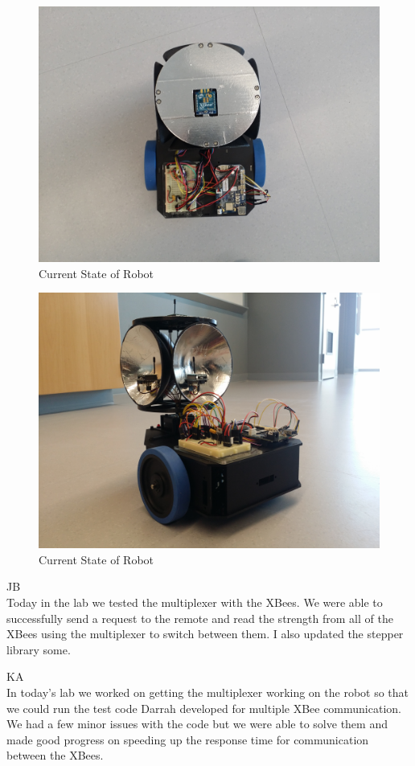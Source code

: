 \documentclass[fontsize=11pt, %
                             paper=letter, %
                             openany, %
                             captions=tableheading,
                             index=totoc,
                             hyperref]{labbook}
\begin{document}
\begin{addmargin}[0cm]{0cm}
\begin{figure}
    \center
    \includegraphics[width=4.5in]{figs/img/robot2.jpg}
    \caption{Current State of Robot}
    \label{fig:robot2}
\end{figure}

\begin{figure}
    \center
    \includegraphics[width=4.5in]{figs/img/robot3.jpg}
    \caption{Current State of Robot}
    \label{fig:robot3}
\end{figure}

JB\\
Today in the lab we tested the multiplexer with the XBees. We were able to successfully send a request to the remote and read the strength from all of the XBees using the multiplexer to switch between them. I also updated the stepper library some.

\vspace*{12pt}
KA\\
In today's lab we worked on getting the multiplexer working on the robot so that we could run the test code Darrah developed for multiple XBee communication. We had a few minor issues with the code but we were able to solve them and made good progress on speeding up the response time for communication between the XBees.


\end{addmargin}
\end{document}

